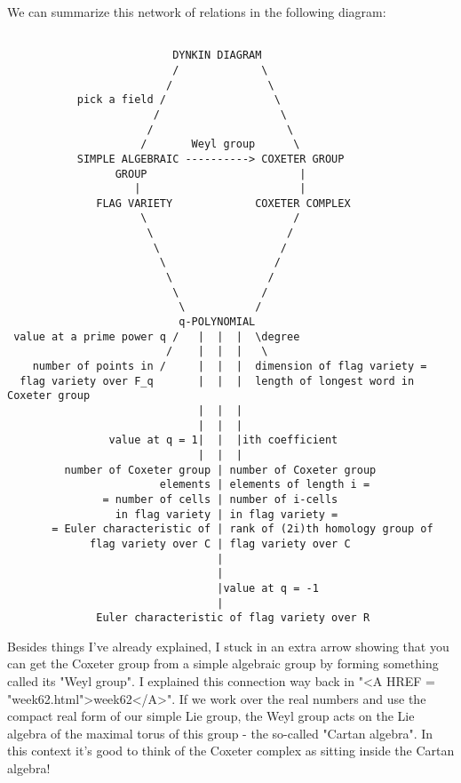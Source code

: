 We can summarize this network of relations in the following diagram:



\begin{verbatim}

                          DYNKIN DIAGRAM
                          /             \
                         /               \
           pick a field /                 \ 
                       /                   \
                      /                     \
                     /       Weyl group      \
           SIMPLE ALGEBRAIC ----------> COXETER GROUP 
                 GROUP                        | 
                    |                         | 
              FLAG VARIETY             COXETER COMPLEX 
                     \                       /
                      \                     /
                       \                   /
                        \                 /
                         \               /
                          \             /
                           \           /
                           q-POLYNOMIAL
 value at a prime power q /   |  |  |  \degree
                         /    |  |  |   \
    number of points in /     |  |  |  dimension of flag variety =
  flag variety over F_q       |  |  |  length of longest word in Coxeter group
                              |  |  |
                              |  |  |
                value at q = 1|  |  |ith coefficient
                              |  |  |
         number of Coxeter group | number of Coxeter group 
                        elements | elements of length i =
               = number of cells | number of i-cells  
                 in flag variety | in flag variety = 
       = Euler characteristic of | rank of (2i)th homology group of
             flag variety over C | flag variety over C
                                 |
                                 |
                                 |value at q = -1
                                 |
              Euler characteristic of flag variety over R 
\end{verbatim}
    

Besides things I've already explained, I stuck in an extra arrow showing
that you can get the Coxeter group from a simple algebraic group by
forming something called its "Weyl group".  I explained this
connection way back in "<A HREF = "week62.html">week62</A>".
If we work over the real numbers and use the compact real form of our
simple Lie group, the Weyl group acts on the Lie algebra of the maximal
torus of this group - the so-called "Cartan algebra".  In this
context it's good to think of the Coxeter complex as sitting inside the
Cartan algebra!

